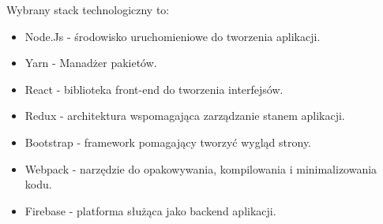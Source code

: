 Wybrany stack technologiczny to:
\begin{itemize}
    \item Node.Js - środowisko uruchomieniowe do tworzenia aplikacji.
    \item Yarn - Manadżer pakietów.
    \item React -  biblioteka front-end do tworzenia interfejsów.
    \item Redux - architektura wspomagająca zarządzanie stanem aplikacji.
    \item Bootstrap - framework pomagający tworzyć wygląd strony.
    \item Webpack - narzędzie do opakowywania, kompilowania i minimalizowania kodu.
    \item Firebase - platforma służąca jako backend aplikacji.
\end{itemize}
